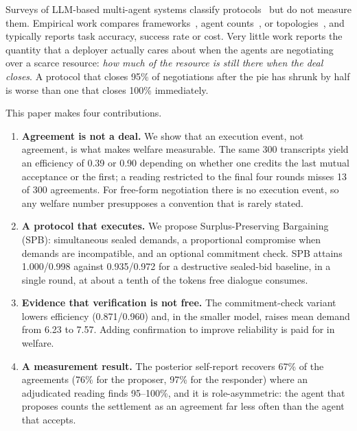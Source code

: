 \documentclass[11pt]{article}
\begin{document}
Surveys of LLM-based multi-agent systems classify protocols~\cite{guo2024survey,chen2024survey,beyondselftalk} but do not measure them. Empirical work compares frameworks~\cite{maseval,mafbench}, agent counts~\cite{multi_llm_agent,scaling2026}, or topologies~\cite{gdesigner}, and typically reports task accuracy, success rate or cost. Very little work reports the quantity that a deployer actually cares about when the agents are negotiating over a scarce resource: \emph{how much of the resource is still there when the deal closes}. A protocol that closes 95\% of negotiations after the pie has shrunk by half is worse than one that closes 100\% immediately.

This paper makes four contributions.

\begin{enumerate}[leftmargin=*,itemsep=2pt]
\item \textbf{Agreement is not a deal.} We show that an execution event, not agreement, is what makes welfare measurable. The same 300 transcripts yield an efficiency of 0.39 or 0.90 depending on whether one credits the last mutual acceptance or the first; a reading restricted to the final four rounds misses 13 of 300 agreements. For free-form negotiation there is no execution event, so any welfare number presupposes a convention that is rarely stated.

\item \textbf{A protocol that executes.} We propose Surplus-Preserving Bargaining (SPB): simultaneous sealed demands, a proportional compromise when demands are incompatible, and an optional commitment check. SPB attains 1.000/0.998 against 0.935/0.972 for a destructive sealed-bid baseline, in a single round, at about a tenth of the tokens free dialogue consumes.

\item \textbf{Evidence that verification is not free.} The commitment-check variant lowers efficiency (0.871/0.960) and, in the smaller model, raises mean demand from 6.23 to 7.57. Adding confirmation to improve reliability is paid for in welfare.

\item \textbf{A measurement result.} The posterior self-report recovers 67\% of the agreements (76\% for the proposer, 97\% for the responder) where an adjudicated reading finds 95--100\%, and it is role-asymmetric: the agent that proposes counts the settlement as an agreement far less often than the agent that accepts.
\end{enumerate}
\end{document}
